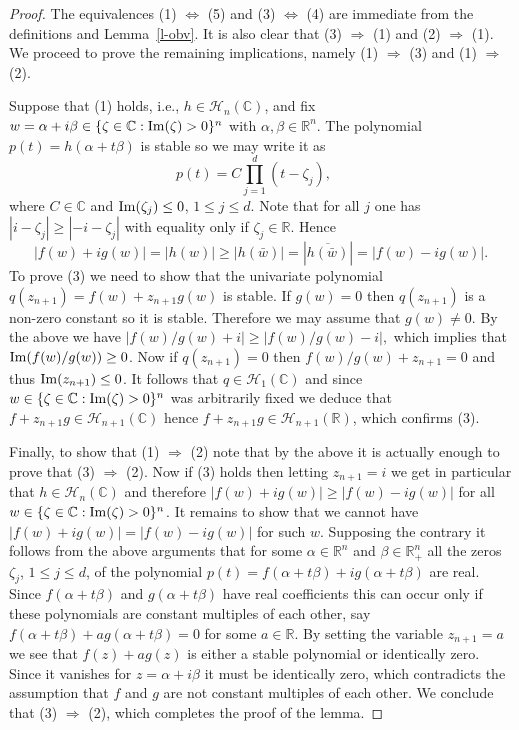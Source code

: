 \documentclass[10pt,reqno]{amsart}
\theoremstyle{plain}
\theoremstyle{definition}
\theoremstyle{remark}
\numberwithin{equation}{section}
\newcommand{\HH}{\mathcal{H}}
\newcommand{\RR}{\mathbb{R}}
\newcommand{\CC}{\mathbb{C}}
\renewcommand{\Im}{{\rm Im}}
\begin{document}
\begin{proof} 
The equivalences (1) $\Leftrightarrow$ (5) and (3) $\Leftrightarrow$ (4) are 
immediate from the definitions and 
Lemma~\ref{l-obv}. It is also clear that 
(3) $\Rightarrow$ (1) and (2) $\Rightarrow$ (1). We proceed to 
prove the remaining implications, namely 
(1) $\Rightarrow$ (3) and (1) $\Rightarrow$ (2). 

Suppose that (1) holds, i.e., $h\in\HH_n(\CC)$, and fix $w=\alpha + i\beta \in 
\{\zeta \in \CC: \Im(\zeta)>0\}^n$ with $\alpha,\beta\in\RR^n$. The polynomial 
$p(t)= h(\alpha+t\beta)$ is stable so we may write it as 
$$
p(t)= C\prod_{j=1}^d(t-\zeta_j), \quad  
$$ 
where $C \in \CC$ and $\Im(\zeta_j) \leq 0$, $1\le j\le d$. 
Note that for all $j$ one has $|i-\zeta_j| \ge |-i-\zeta_j|$ with equality 
only if $\zeta_j \in \RR$. Hence 
$$
|f(w)+ig(w)| = |h(w)| \geq |h(\bar{w})|= \left|\overline{h(\bar{w})}\right|
=|f(w)-ig(w)|.  
$$
To prove (3) we need to show that the univariate polynomial 
$q(z_{n+1}) = f(w)+z_{n+1}g(w)$ is stable. If $g(w)=0$ 
then $q(z_{n+1})$ is a non-zero constant so it is stable. Therefore we 
may assume that $g(w) \neq 0$. By the above we have 
$
|f(w)/g(w)+i| \geq |f(w)/g(w)-i|, 
$
which implies that $\Im(f(w)/g(w)) \geq 0$. Now if $q(z_{n+1})=0$ then 
$f(w)/g(w) + z_{n+1} =0$
and thus $\Im(z_{n+1})\leq 0$. It follows that $q\in\HH_1(\CC)$ and since
$w\in\{\zeta \in \CC: \Im(\zeta)>0\}^n$ was arbitrarily fixed we deduce that
$f+z_{n+1}g\in\HH_{n+1}(\CC)$ hence $f+z_{n+1}g\in\HH_{n+1}(\RR)$, 
which confirms (3). 

Finally, to show that (1) $\Rightarrow$ (2) note that by the above it is actually 
enough to prove that (3) $\Rightarrow$ (2). Now if (3) holds then letting $z_{n+1}=i$ we get in particular that 
$h\in\HH_n(\CC)$ and therefore $|f(w)+ig(w)|\ge |f(w)-ig(w)|$ for all 
$w\in\{\zeta \in \CC: \Im(\zeta)>0\}^n$. It remains to show that we cannot 
have $|f(w)+ig(w)| =|f(w)-ig(w)|$ for such $w$. Supposing the contrary it 
follows from the above arguments that for some $\alpha\in\RR^n$ and 
$\beta\in\RR_+^n$ all the zeros $\zeta_j$, $1\le j\le d$, of
the polynomial $p(t)=f(\alpha+t\beta) + i g(\alpha+t\beta)$ are real. Since
$f(\alpha+t\beta)$ and $g(\alpha+t\beta)$ have real coefficients this can 
occur only if these polynomials are constant multiples of each other, say 
$f(\alpha+t\beta) + a g(\alpha+t\beta)=0$ for some $a\in\RR$. By setting the 
variable $z_{n+1}=a$ we see that $f(z) + a g(z)$ is either a stable 
polynomial or identically zero. Since it vanishes for $z=\alpha+i\beta$ it 
must be identically zero, which contradicts the assumption that $f$ and $g$ 
are not constant multiples of each other. We conclude that 
(3) $\Rightarrow$ (2), which 
completes the proof of the lemma.
\end{proof}
\end{document}
